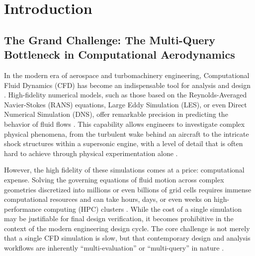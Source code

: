\documentclass[dsc, EN]{ufabcFHZh}
\begin{document}
\chapter{Introduction}

\section{The Grand Challenge: The Multi-Query Bottleneck in Computational Aerodynamics}


In the modern era of aerospace and turbomachinery engineering, Computational Fluid Dynamics (CFD) has become an indispensable tool for analysis and design \citep{Spalart2016}. High-fidelity numerical models, such as those based on the Reynolds-Averaged Navier-Stokes (RANS) equations, Large Eddy Simulation (LES), or even Direct Numerical Simulation (DNS), offer remarkable precision in predicting the behavior of fluid flows \citep{Pereira2021}. This capability allows engineers to investigate complex physical phenomena, from the turbulent wake behind an aircraft to the intricate shock structures within a supersonic engine, with a level of detail that is often hard to achieve through physical experimentation alone \citep{Schiestel2022}.

However, the high fidelity of these simulations comes at a price: computational expense. Solving the governing equations of fluid motion across complex geometries discretized into millions or even billions of grid cells requires immense computational resources and can take hours, days, or even weeks on high-performance computing (HPC) clusters \citep{Slotnick2014}. While the cost of a single simulation may be justifiable for final design verification, it becomes prohibitive in the context of the modern engineering design cycle. The core challenge is not merely that a single CFD simulation is slow, but that contemporary design and analysis workflows are inherently ``multi-evaluation'' or ``multi-query'' in nature \citep{Bekemeyer2025}.
\end{document}

